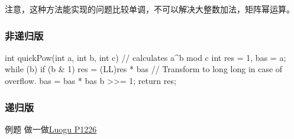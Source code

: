 注意，这种方法能实现的问题比较单调，不可以解决大整数加法，矩阵幂运算。

\subsubsection{非递归版}

\begin{cppcode}
int quickPow(int a, int b, int c) {
  // calculates a^b mod c
  int res = 1, bas = a;
  while (b) {
    if (b & 1) res = (LL)res * bas %
    // Transform to long long in case of overflow.
    bas = bas * bas %
    b >>= 1;
  }
  return res;
}
\end{cppcode}

\subsubsection{递归版}


\begin{NOTE}{例题}{}
做一做\href{https://www.luogu.org/problemnew/show/P1226}{Luogu P1226}
\end{NOTE}

